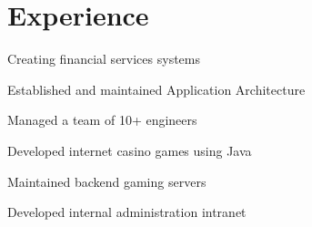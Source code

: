 \documentclass[letterpaper]{deedy-resume} %
\begin{document}
%
\begin{minipage}[t]{0.66\textwidth} %


\section{Experience}


\vspace{\topsep} %
\begin{tightitemize}
\item Creating financial services systems
\item Established and maintained Application Architecture
\item Managed a team of 10+ engineers
\end{tightitemize}

\sectionspace %



\begin{tightitemize}
\item Developed internet casino games using Java
\item Maintained backend gaming servers
\item Developed internal administration intranet
\end{tightitemize}

\sectionspace %


\end{minipage} %



\end{document}
